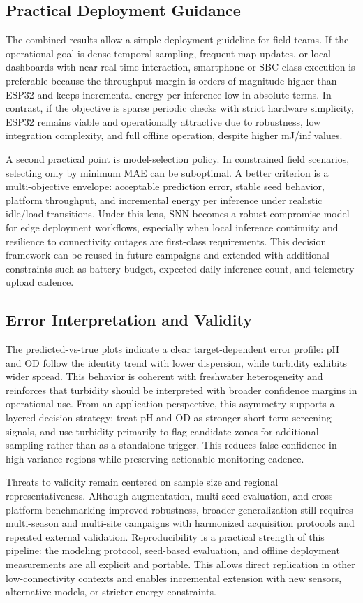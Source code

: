 \subsection{Practical Deployment Guidance}
The combined results allow a simple deployment guideline for field teams. If the operational goal is dense temporal sampling, frequent map updates, or local dashboards with near-real-time interaction, smartphone or SBC-class execution is preferable because the throughput margin is orders of magnitude higher than ESP32 and keeps incremental energy per inference low in absolute terms. In contrast, if the objective is sparse periodic checks with strict hardware simplicity, ESP32 remains viable and operationally attractive due to robustness, low integration complexity, and full offline operation, despite higher mJ/inf values.

A second practical point is model-selection policy. In constrained field scenarios, selecting only by minimum MAE can be suboptimal. A better criterion is a multi-objective envelope: acceptable prediction error, stable seed behavior, platform throughput, and incremental energy per inference under realistic idle/load transitions. Under this lens, SNN becomes a robust compromise model for edge deployment workflows, especially when local inference continuity and resilience to connectivity outages are first-class requirements. This decision framework can be reused in future campaigns and extended with additional constraints such as battery budget, expected daily inference count, and telemetry upload cadence.

\subsection{Error Interpretation and Validity}
The predicted-vs-true plots indicate a clear target-dependent error profile: pH and OD follow the identity trend with lower dispersion, while turbidity exhibits wider spread. This behavior is coherent with freshwater heterogeneity and reinforces that turbidity should be interpreted with broader confidence margins in operational use. From an application perspective, this asymmetry supports a layered decision strategy: treat pH and OD as stronger short-term screening signals, and use turbidity primarily to flag candidate zones for additional sampling rather than as a standalone trigger. This reduces false confidence in high-variance regions while preserving actionable monitoring cadence.

Threats to validity remain centered on sample size and regional representativeness. Although augmentation, multi-seed evaluation, and cross-platform benchmarking improved robustness, broader generalization still requires multi-season and multi-site campaigns with harmonized acquisition protocols and repeated external validation. Reproducibility is a practical strength of this pipeline: the modeling protocol, seed-based evaluation, and offline deployment measurements are all explicit and portable. This allows direct replication in other low-connectivity contexts and enables incremental extension with new sensors, alternative models, or stricter energy constraints.

